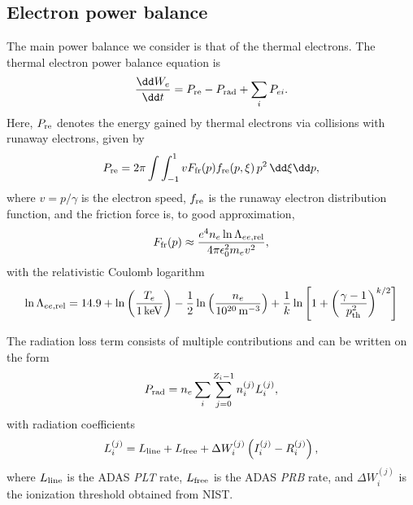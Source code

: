 \documentclass{notes}
\begin{document}
	\subsection{Electron power balance}
	The main power balance we consider is that of the thermal electrons. The
	thermal electron power balance equation is
	\begin{equation}
		\frac{\dd W_e}{\dd t} =
			P_{\rm re} - P_{\rm rad} + \sum_i P_{ei}.
	\end{equation}
	Here, $P_{\rm re}$ denotes the energy gained by thermal electrons via
	collisions with runaway electrons, given by
	\begin{equation}
		P_{\rm re} = 2\pi\int \int_{-1}^1 vF_{\rm fr}(p) f_{\rm re}(p,\xi)\,p^2\,\dd\xi\dd p,
	\end{equation}
	where $v=p/\gamma$ is the electron speed, $f_{\rm re}$ is the runaway
	electron distribution function, and the friction force is, to good
	approximation,
	\begin{equation}
		F_{\rm fr}(p)\approx \frac{e^4 n_e\ln\Lambda_{ee,{\rm rel}}}{4\pi\epsilon_0^2 m_e v^2},
	\end{equation}
	with the relativistic Coulomb logarithm
	\begin{equation}
		\ln\Lambda_{ee,{\rm rel}} =
			14.9 + \ln\left(\frac{T_e}{\SI{1}{keV}}\right) - \frac{1}{2}\ln\left(\frac{n_e}{10^{20}\,\si{\per\meter\cubed}}\right)
			+ \frac{1}{k}\ln\left[ 1 + \left(\frac{\gamma-1}{p_{\rm th}^2}\right)^{k/2}\right]
	\end{equation}
	
	The radiation loss term consists of multiple contributions and can be
	written on the form
	\begin{equation}
		P_{\rm rad} = n_e\sum_i\sum_{j=0}^{Z_i-1}
			n_i^{(j)} L_i^{(j)},
	\end{equation}
	with radiation coefficients
	\begin{equation}
		L_i^{(j)} = L_{\rm line} + L_{\rm free} +
			\Delta W_i^{(j)}\left(I_i^{(j)} - R_i^{(j)}\right),
	\end{equation}
	where $L_{\rm line}$ is the ADAS \emph{PLT} rate, $L_{\rm free}$ is the
	ADAS \emph{PRB} rate, and $\Delta W_i^{(j)}$ is the ionization threshold
	obtained from NIST.
\end{document}
